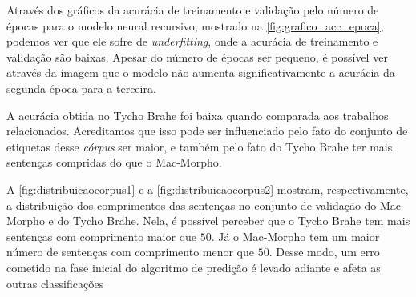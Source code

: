 Através dos gráficos da acurácia de treinamento e validação pelo número de épocas para o modelo neural recursivo, mostrado na \autoref{fig:grafico_acc_epoca}, podemos ver que ele sofre de \textit{underfitting}, onde a acurácia de treinamento e validação são baixas. Apesar do número de épocas ser pequeno, é possível ver através da imagem que o modelo não aumenta significativamente a acurácia da segunda época para a terceira.

A acurácia obtida no Tycho Brahe foi baixa quando comparada aos trabalhos relacionados. Acreditamos que isso pode ser influenciado pelo fato do conjunto de etiquetas desse \textit{córpus} ser maior, e também pelo fato do Tycho Brahe ter mais sentenças compridas do que o Mac-Morpho. 






A \autoref{fig:distribuicaocorpus1} e a \autoref{fig:distribuicaocorpus2} mostram, respectivamente, a distribuição dos comprimentos das sentenças no conjunto de validação do Mac-Morpho e do Tycho Brahe. Nela, é possível perceber que o Tycho Brahe tem mais sentenças com comprimento maior que $50$. Já o Mac-Morpho tem um maior número de sentenças com comprimento menor que $50$. Desse modo, um erro cometido na fase inicial do algoritmo de predição é levado adiante e afeta as outras classificações 

